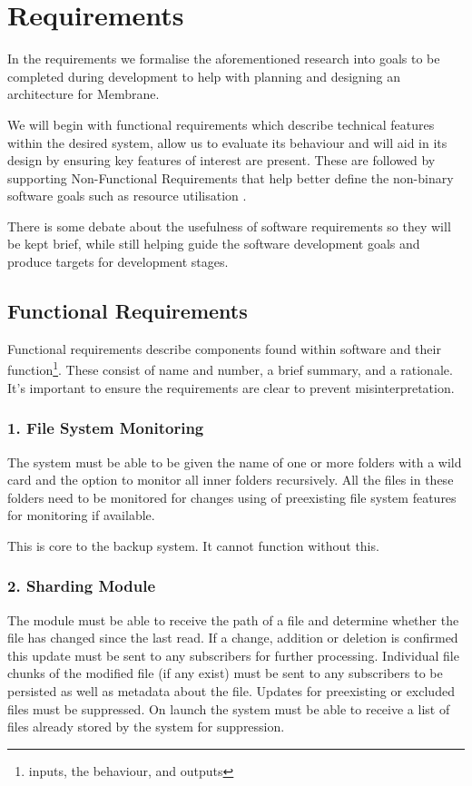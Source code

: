 \documentclass[11pt, a4paper, twoside]{report}
\begin{document}
\section{Requirements} \label{sec:requirements}

In the requirements we formalise the aforementioned research into goals to be completed during development to help with planning and designing an architecture for Membrane.

We will begin with functional requirements which describe technical features within the desired system, allow us to evaluate its behaviour and will aid in its design by ensuring key features of interest are present. \citep{van2009requirements} These are followed by supporting Non-Functional Requirements that help better define the non-binary software goals such as resource utilisation \cite{chung2012non}.

There is some debate about the usefulness of software requirements \cite{kneuper1997limits} so they will be kept brief, while still helping guide the software development goals and produce targets for development stages.

\subsection{Functional Requirements}

Functional requirements describe components found within software and their function\footnote{inputs, the behaviour, and outputs}. These consist of name and number, a brief summary, and a rationale. It's important to ensure the requirements are clear to prevent misinterpretation.

\subsubsection{1. File System Monitoring}
The system must be able to be given the name of one or more folders with a wild card and the option to monitor all inner folders recursively. All the files in these folders need to be monitored for changes using of preexisting file system features for monitoring if available.

This is core to the backup system. It cannot function without this.

\subsubsection{2. Sharding Module}
The module must be able to receive the path of a file and determine whether the file has changed since the last read. If a change, addition or deletion is confirmed this update must be sent to any subscribers for further processing. Individual file chunks of the modified file (if any exist) must be sent to any subscribers to be persisted as well as metadata about the file. Updates for preexisting or excluded files must be suppressed. On launch the system must be able to receive a list of files already stored by the system for suppression.
\end{document}
